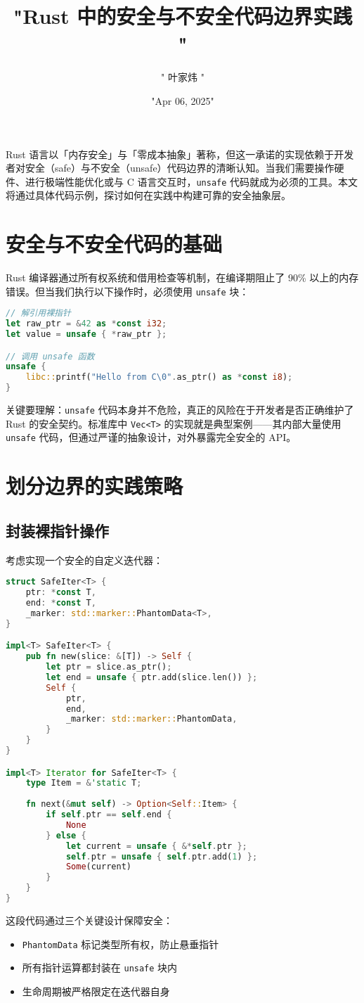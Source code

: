 \title{"Rust 中的安全与不安全代码边界实践 "}
\author{" 叶家炜 "}
\date{"Apr 06, 2025"}
\maketitle
Rust 语言以「内存安全」与「零成本抽象」著称，但这一承诺的实现依赖于开发者对安全（safe）与不安全（unsafe）代码边界的清晰认知。当我们需要操作硬件、进行极端性能优化或与 C 语言交互时，\verb!unsafe! 代码就成为必须的工具。本文将通过具体代码示例，探讨如何在实践中构建可靠的安全抽象层。\par
\chapter{安全与不安全代码的基础}
Rust 编译器通过所有权系统和借用检查等机制，在编译期阻止了 90\%{} 以上的内存错误。但当我们执行以下操作时，必须使用 \verb!unsafe! 块：\par
\begin{lstlisting}[language=rust]
// 解引用裸指针
let raw_ptr = &42 as *const i32;
let value = unsafe { *raw_ptr };

// 调用 unsafe 函数
unsafe {
    libc::printf("Hello from C\0".as_ptr() as *const i8);
}
\end{lstlisting}
关键要理解：\verb!unsafe! 代码本身并不危险，真正的风险在于开发者是否正确维护了 Rust 的安全契约。标准库中 \verb!Vec<T>! 的实现就是典型案例——其内部大量使用 \verb!unsafe! 代码，但通过严谨的抽象设计，对外暴露完全安全的 API。\par
\chapter{划分边界的实践策略}
\section{封装裸指针操作}
考虑实现一个安全的自定义迭代器：\par
\begin{lstlisting}[language=rust]
struct SafeIter<T> {
    ptr: *const T,
    end: *const T,
    _marker: std::marker::PhantomData<T>,
}

impl<T> SafeIter<T> {
    pub fn new(slice: &[T]) -> Self {
        let ptr = slice.as_ptr();
        let end = unsafe { ptr.add(slice.len()) };
        Self {
            ptr,
            end,
            _marker: std::marker::PhantomData,
        }
    }
}

impl<T> Iterator for SafeIter<T> {
    type Item = &'static T;
    
    fn next(&mut self) -> Option<Self::Item> {
        if self.ptr == self.end {
            None
        } else {
            let current = unsafe { &*self.ptr };
            self.ptr = unsafe { self.ptr.add(1) };
            Some(current)
        }
    }
}
\end{lstlisting}
这段代码通过三个关键设计保障安全：\par
\begin{itemize}
\item \verb!PhantomData! 标记类型所有权，防止悬垂指针
\item 所有指针运算都封装在 \verb!unsafe! 块内
\item 生命周期被严格限定在迭代器自身
\end{itemize}
